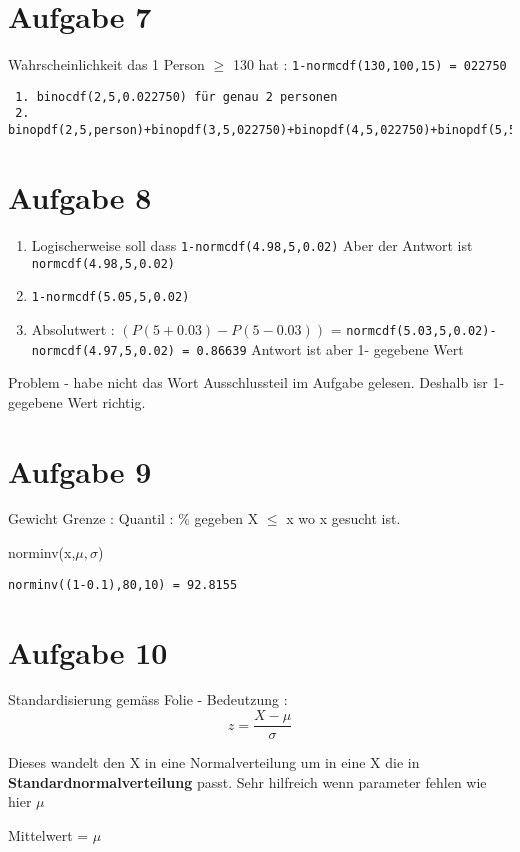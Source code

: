 \documentclass[a4paper,10pt]{scrbook}
\begin{document}
\section*{Aufgabe 7}

Wahrscheinlichkeit das 1 Person $\ge$ 130 hat :
\texttt{1-normcdf(130,100,15) = 022750 }
\begin{verbatim}
 1. binocdf(2,5,0.022750) für genau 2 personen
 2. binopdf(2,5,person)+binopdf(3,5,022750)+binopdf(4,5,022750)+binopdf(5,5,022750)
\end{verbatim}
\section*{Aufgabe 8}
\begin{enumerate}
\item Logischerweise soll dass \texttt{1-normcdf(4.98,5,0.02)}
Aber der Antwort ist \texttt{normcdf(4.98,5,0.02)}
\item \texttt{1-normcdf(5.05,5,0.02)}
\item Absolutwert : $(P(5+0.03)-P(5-0.03))$ = \texttt{normcdf(5.03,5,0.02)-normcdf(4.97,5,0.02) = 0.86639} Antwort ist 
aber 1- gegebene Wert
\end{enumerate}

Problem - habe nicht das Wort Ausschlussteil im Aufgabe gelesen. Deshalb isr 1- gegebene Wert richtig.

\section*{Aufgabe 9}
Gewicht Grenze : Quantil : \% gegeben X $\le$ x wo x gesucht ist.
\begin{framed}
 norminv(x,$\mu,\sigma$)
\end{framed}

\texttt{norminv((1-0.1),80,10) = 92.8155}

\section*{Aufgabe 10}
\begin{framed}
 Standardisierung gemäss Folie - Bedeutzung :
 \begin{equation}
z = \frac{X-\mu}{\sigma} 
\end{equation}

Dieses wandelt den X in eine Normalverteilung um in eine X die in \textbf{Standardnormalverteilung} passt.
Sehr hilfreich wenn parameter fehlen wie hier $\mu$

Mittelwert = $\mu$
\end{framed}
\end{document}
